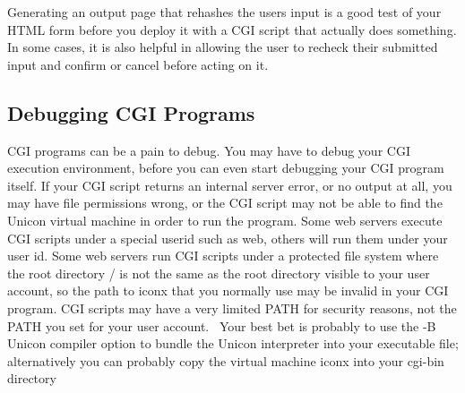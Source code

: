 {

Generating an output page that rehashes the user{\textquotesingle}s
input is a good test of your HTML form before you deploy it with a CGI
script that actually does something. In some cases, it is also helpful
in allowing the user to recheck their submitted input and confirm or
cancel before acting on it.

\subsection{Debugging CGI Programs}

CGI programs can be a pain to debug. You may have to debug your CGI
execution environment, before you can even start debugging your CGI
program itself. If your CGI script returns an {\textquotedbl}internal
server error{\textquotedbl}, or no output at all, you may have file
permissions wrong, or the CGI script may not be able to find the Unicon
virtual machine in order to run the program. Some web servers execute
CGI scripts under a special userid such as
{\textquotedbl}web{\textquotedbl}, others will run them under your user
id. Some web servers run CGI scripts under a protected file system
where the root directory {\textquotedbl}/{\textquotedbl} is not the
same as the root directory visible to your user account, so the path to
iconx that you normally use may be invalid in your CGI program. CGI
scripts may have a very limited PATH for security reasons, not the PATH
you set for your user account. \ Your best bet is probably to use the
-B Unicon compiler option to bundle the Unicon interpreter into your
executable file; alternatively you can probably copy the virtual
machine {\textquotedbl}iconx{\textquotedbl} into your cgi-bin directory

}

